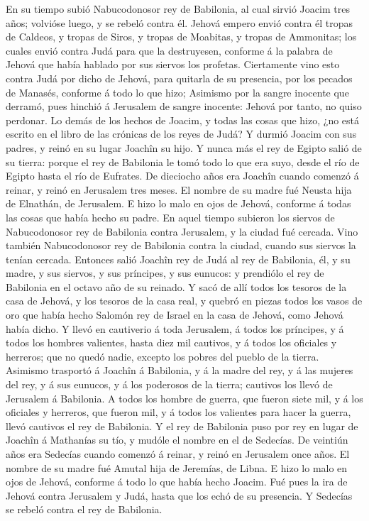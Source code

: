  En su tiempo subió Nabucodonosor rey de Babilonia, al cual
sirvió Joacim tres años; volvióse luego, y se rebeló contra él.
 Jehová empero envió contra él tropas de Caldeos, y tropas
de Siros, y tropas de Moabitas, y tropas de Ammonitas; los cuales envió
contra Judá para que la destruyesen, conforme á la palabra de Jehová que
había hablado por sus siervos los profetas.  Ciertamente
vino esto contra Judá por dicho de Jehová, para quitarla de su
presencia, por los pecados de Manasés, conforme á todo lo que hizo;
 Asimismo por la sangre inocente que derramó, pues hinchió á
Jerusalem de sangre inocente: Jehová por tanto, no quiso perdonar.
 Lo demás de los hechos de Joacim, y todas las cosas que
hizo, ¿no está escrito en el libro de las crónicas de los reyes de Judá?
 Y durmió Joacim con sus padres, y reinó en su lugar Joachîn
su hijo.  Y nunca más el rey de Egipto salió de su tierra:
porque el rey de Babilonia le tomó todo lo que era suyo, desde el río de
Egipto hasta el río de Eufrates.  De dieciocho años era
Joachîn cuando comenzó á reinar, y reinó en Jerusalem tres meses. El
nombre de su madre fué Neusta hija de Elnathán, de Jerusalem.
 E hizo lo malo en ojos de Jehová, conforme á todas las
cosas que había hecho su padre.  En aquel tiempo subieron
los siervos de Nabucodonosor rey de Babilonia contra Jerusalem, y la
ciudad fué cercada.  Vino también Nabucodonosor rey de
Babilonia contra la ciudad, cuando sus siervos la tenían cercada.
 Entonces salió Joachîn rey de Judá al rey de Babilonia,
él, y su madre, y sus siervos, y sus príncipes, y sus eunucos: y
prendiólo el rey de Babilonia en el octavo año de su reinado.
 Y sacó de allí todos los tesoros de la casa de Jehová, y
los tesoros de la casa real, y quebró en piezas todos los vasos de oro
que había hecho Salomón rey de Israel en la casa de Jehová, como Jehová
había dicho.  Y llevó en cautiverio á toda Jerusalem, á
todos los príncipes, y á todos los hombres valientes, hasta diez mil
cautivos, y á todos los oficiales y herreros; que no quedó nadie,
excepto los pobres del pueblo de la tierra.  Asimismo
trasportó á Joachîn á Babilonia, y á la madre del rey, y á las mujeres
del rey, y á sus eunucos, y á los poderosos de la tierra; cautivos los
llevó de Jerusalem á Babilonia.  A todos los hombre de
guerra, que fueron siete mil, y á los oficiales y herreros, que fueron
mil, y á todos los valientes para hacer la guerra, llevó cautivos el rey
de Babilonia.  Y el rey de Babilonia puso por rey en lugar
de Joachîn á Mathanías su tío, y mudóle el nombre en el de Sedecías.
 De veintiún años era Sedecías cuando comenzó á reinar, y
reinó en Jerusalem once años. El nombre de su madre fué Amutal hija de
Jeremías, de Libna.  E hizo lo malo en ojos de Jehová,
conforme á todo lo que había hecho Joacim.  Fué pues la ira
de Jehová contra Jerusalem y Judá, hasta que los echó de su presencia. Y
Sedecías se rebeló contra el rey de Babilonia.

